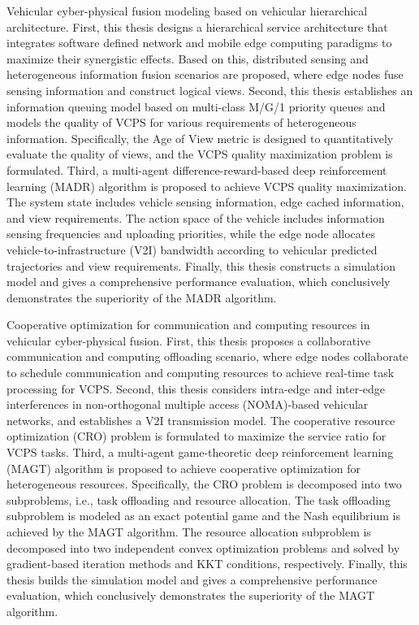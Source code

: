\begin{eabstract}
 Vehicular cyber-physical fusion modeling based on vehicular hierarchical architecture. First, this thesis designs a hierarchical service architecture that integrates software defined network and mobile edge computing paradigms to maximize their synergistic effects. Based on this, distributed sensing and heterogeneous information fusion scenarios are proposed, where edge nodes fuse sensing information and construct logical views. Second, this thesis establishes an information queuing model based on multi-class M/G/1 priority queues and models the quality of VCPS for various requirements of heterogeneous information. Specifically, the Age of View metric is designed to quantitatively evaluate the quality of views, and the VCPS quality maximization problem is formulated. Third, a multi-agent difference-reward-based deep reinforcement learning (MADR) algorithm is proposed to achieve VCPS quality maximization. The system state includes vehicle sensing information, edge cached information, and view requirements. The action space of the vehicle includes information sensing frequencies and uploading priorities, while the edge node allocates vehicle-to-infrastructure (V2I) bandwidth according to vehicular predicted trajectories and view requirements. Finally, this thesis constructs a simulation model and gives a comprehensive performance evaluation, which conclusively demonstrates the superiority of the MADR algorithm.

 Cooperative optimization for communication and computing resources in vehicular cyber-physical fusion. First, this thesis proposes a collaborative communication and computing offloading scenario, where edge nodes collaborate to schedule communication and computing resources to achieve real-time task processing for VCPS. Second, this thesis considers intra-edge and inter-edge interferences in non-orthogonal multiple access (NOMA)-based vehicular networks, and establishes a V2I transmission model. The cooperative resource optimization (CRO) problem is formulated to maximize the service ratio for VCPS tasks. Third, a multi-agent game-theoretic deep reinforcement learning (MAGT) algorithm is proposed to achieve cooperative optimization for heterogeneous resources. Specifically, the CRO problem is decomposed into two subproblems, i.e., task offloading and resource allocation. The task offloading subproblem is modeled as an exact potential game and the Nash equilibrium is achieved by the MAGT algorithm. The resource allocation subproblem is decomposed into two independent convex optimization problems and solved by gradient-based iteration methods and KKT conditions, respectively. Finally, this thesis builds the simulation model and gives a comprehensive performance evaluation, which conclusively demonstrates the superiority of the MAGT algorithm.


\end{eabstract}
